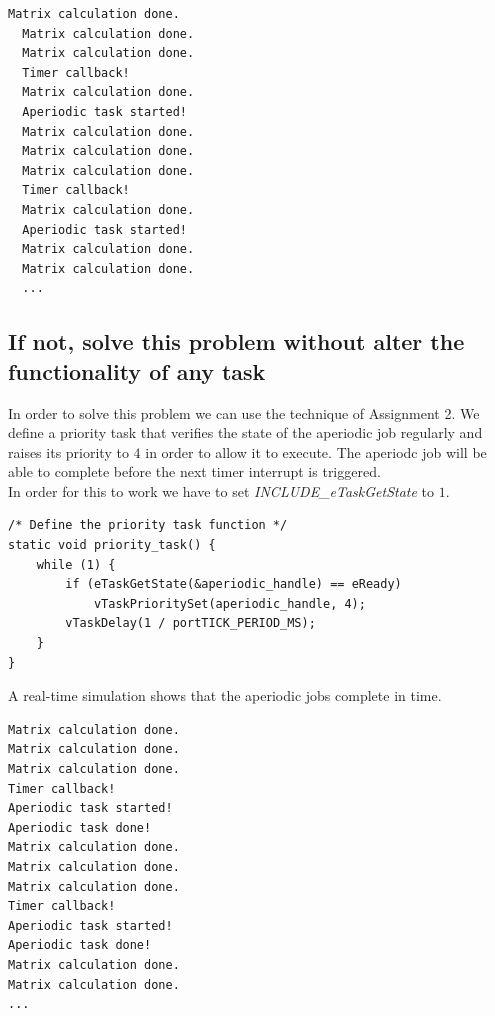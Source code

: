\documentclass[a4paper]{article}
\begin{document}
\newpage

\begin{lstlisting}[label=Aperiodic job not completing,caption=The aperiodic job is started but does not complete in time]
  Matrix calculation done.
  Matrix calculation done.
  Matrix calculation done.
  Timer callback!
  Matrix calculation done.
  Aperiodic task started!
  Matrix calculation done.
  Matrix calculation done.
  Matrix calculation done.
  Timer callback!
  Matrix calculation done.
  Aperiodic task started!
  Matrix calculation done.
  Matrix calculation done.
  ...
\end{lstlisting}

\subsection{If not, solve this problem without alter the functionality of any task}

In order to solve this problem we can use the technique of Assignment 2. We define a priority task that verifies the state of the aperiodic job regularly and raises its priority to $4$ in order to allow it to execute. The aperiodc job will be able to complete before the next timer interrupt is triggered. \\
In order for this to work we have to set \textit{INCLUDE\_eTaskGetState} to $1$.\\

\begin{lstlisting}[label=Priority task,caption=Definition of the priority task]
/* Define the priority task function */
static void priority_task() {
	while (1) {
		if (eTaskGetState(&aperiodic_handle) == eReady)
			vTaskPrioritySet(aperiodic_handle, 4);
		vTaskDelay(1 / portTICK_PERIOD_MS);
	}
}
\end{lstlisting}

A real-time simulation shows that the aperiodic jobs complete in time.\\

\begin{lstlisting}[label=Aperiodic job completing,caption=The aperiodic job completes in time]
Matrix calculation done.
Matrix calculation done.
Matrix calculation done.
Timer callback!
Aperiodic task started!
Aperiodic task done!
Matrix calculation done.
Matrix calculation done.
Matrix calculation done.
Timer callback!
Aperiodic task started!
Aperiodic task done!
Matrix calculation done.
Matrix calculation done.
...
\end{lstlisting}
\end{document}

